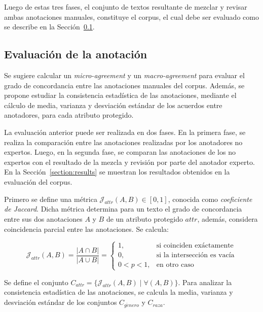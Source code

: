 Luego de estas tres fases, el conjunto de textos resultante de mezclar y revisar ambas anotaciones manuales, constituye el corpus, el 
cual debe ser evaluado como se describe en la Secci\'on~\ref{subsection:annotation_evaluation}.

\subsection{Evaluaci\'on de la anotaci\'on}\label{subsection:annotation_evaluation}
Se sugiere calcular un \emph{micro-agreement} y un \emph{macro-agreement} para evaluar el grado de concordancia entre las anotaciones
manuales del corpus. Adem\'as, se propone estudiar la consistencia estad\'istica de las anotaciones, mediante el c\'alculo  
de media, varianza y desviaci\'on est\'andar de los acuerdos entre anotadores, para cada atributo protegido.

La evaluaci\'on anterior puede ser realizada en dos fases. En la primera fase, se realiza la comparaci\'on entre las anotaciones 
realizadas por los anotadores no expertos. Luego, en la segunda fase, se comparan las anotaciones de los 
no expertos con el resultado de la mezcla y revisi\'on por parte del anotador experto. En la Secci\'on~\ref{section:results} 
se muestran los resultados obtenidos en la evaluaci\'on del corpus.

Primero se define una m\'etrica $\mathcal{J}_{attr}(A, B) \in [0,1]$, conocida como \emph{coeficiente de Jaccard}. Dicha m\'etrica 
determina para un texto el grado de concordancia entre sus dos anotaciones $A$ y $B$ de un atributo protegido $attr$, adem\'as, 
considera coincidencia parcial entre las anotaciones. Se calcula:

\begin{equation}
    \mathcal{J}_{attr}(A, B) = \frac{|A \cap B|}{|A \cup B|} = \begin{cases}
        1, & \text{si coinciden ex\'actamente} \\
        0, & \text{si la intersecci\'on es vac\'ia} \\
        0 < p < 1, & \text{en otro caso}
    \end{cases}
\end{equation}

Se define el conjunto $C_{attr} = \{\mathcal{J}_{attr}(A, B) \mid \forall (A, B)\}$. Para analizar la consistencia estad\'istica 
de las anotaciones, se calcula la media, varianza y desviaci\'on est\'andar de los conjuntos $C_{g\acute{e}nero}$ y $C_{raza}$.

